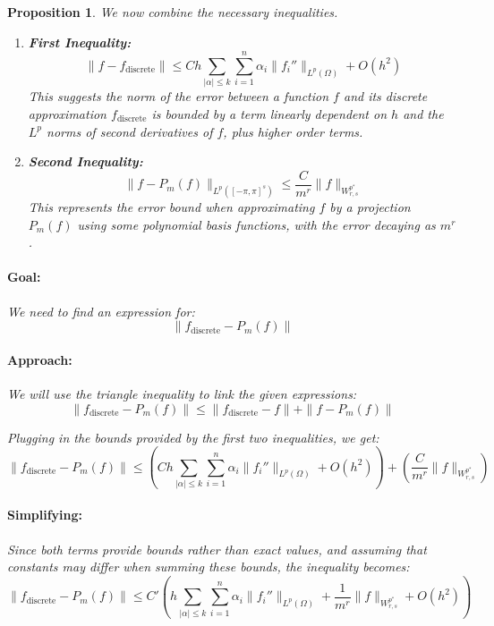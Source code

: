 \documentclass[11pt,a4paper]{article}
\theoremstyle{plain}
\newtheorem{proposition}[theorem]{Proposition}
\theoremstyle{definition}
\theoremstyle{remark}
\begin{document}
\begin{proposition}

We now combine the necessary inequalities.

\begin{enumerate}
    \item \textbf{First Inequality:}
    \[
    \|f - f_{\text{discrete}}\| \leq Ch \sum_{|\alpha| \leq k} \sum_{i=1}^n \alpha_i \|f_i''\|_{L^p(\Omega)} + O(h^2)
    \]
    This suggests the norm of the error between a function \(f\) and its discrete approximation \(f_{\text{discrete}}\) is bounded by a term linearly dependent on \(h\) and the \(L^p\) norms of second derivatives of \(f\), plus higher order terms.
    
    \item \textbf{Second Inequality:}
    \[
    \|f - P_m(f)\|_{L^p([-\pi , \pi]^s)} \leq \frac{C}{m^r} \|f\|_{W^{p^*}_{r,s}}
    \]
    This represents the error bound when approximating \(f\) by a projection \(P_m(f)\) using some polynomial basis functions, with the error decaying as \(m^r\).
\end{enumerate}

\paragraph*{Goal:}

We need to find an expression for:
\[
\|f_{\text{discrete}} - P_m(f)\|
\]

\paragraph*{Approach:}

We will use the triangle inequality to link the given expressions:
\[
\|f_{\text{discrete}} - P_m(f)\| \leq \|f_{\text{discrete}} - f\| + \|f - P_m(f)\|
\]

Plugging in the bounds provided by the first two inequalities, we get:
\[
\|f_{\text{discrete}} - P_m(f)\| \leq (Ch \sum_{|\alpha| \leq k} \sum_{i=1}^n \alpha_i \|f_i''\|_{L^p(\Omega)} + O(h^2)) + \left(\frac{C}{m^r} \|f\|_{W^{p^*}_{r,s}}\right)
\]

\paragraph*{Simplifying:}

Since both terms provide bounds rather than exact values, and assuming that constants may differ when summing these bounds, the inequality becomes:
\[
\|f_{\text{discrete}} - P_m(f)\| \leq C'\left(h \sum_{|\alpha| \leq k} \sum_{i=1}^n \alpha_i \|f_i''\|_{L^p(\Omega)} + \frac{1}{m^r} \|f\|_{W^{p^*}_{r,s}} + O(h^2)\right)
\]


\end{proposition}
\end{document}
